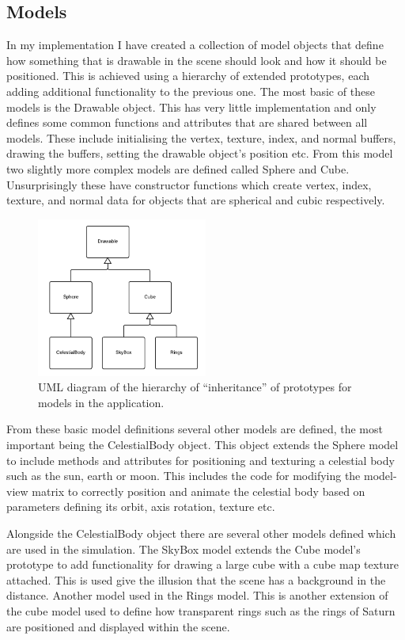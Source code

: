 \documentclass[paper=a4, fontsize=11pt]{scrartcl}	%
\numberwithin{equation}{section}															%
\numberwithin{figure}{section}																%
\numberwithin{table}{section}																%
\begin{document}
\subsection{Models}
In my implementation I have created a collection of model objects that define how something that is drawable in the scene should look and how it should be positioned. This is achieved using a hierarchy of extended prototypes, each adding additional functionality to the previous one. The most basic of these models is the Drawable object. This has very little implementation and only defines some common functions and attributes that are shared between all models. These include initialising the vertex, texture, index, and normal buffers, drawing the buffers, setting the drawable object's position etc. From this model two slightly more complex models are defined called Sphere and Cube. Unsurprisingly these have constructor functions which create vertex, index, texture, and normal data for objects that are spherical and cubic respectively.

\begin{figure}[H]
\centering
\includegraphics[width=0.5\textwidth]{img/model-uml.png}
\caption{UML diagram of the hierarchy of ``inheritance'' of prototypes for models in the  application.}
\label{fig:uml-models}
\end{figure}

From these basic model definitions several other models are defined, the most important being the CelestialBody object. This object extends the Sphere model to include methods and attributes for positioning and texturing a celestial body such as the sun, earth or moon. This includes the code for modifying the model-view matrix to correctly position and animate the celestial body based on parameters defining its orbit, axis rotation, texture etc.

Alongside the CelestialBody object there are several other models defined which are used in the simulation. The SkyBox model extends the Cube model's prototype to add functionality for drawing a large cube with a cube map texture attached. This is used give the illusion that the scene has a background in the distance. Another model used in the Rings model. This is another extension of the cube model used to define how transparent rings such as the rings of Saturn are positioned and displayed within the scene.
\end{document}
